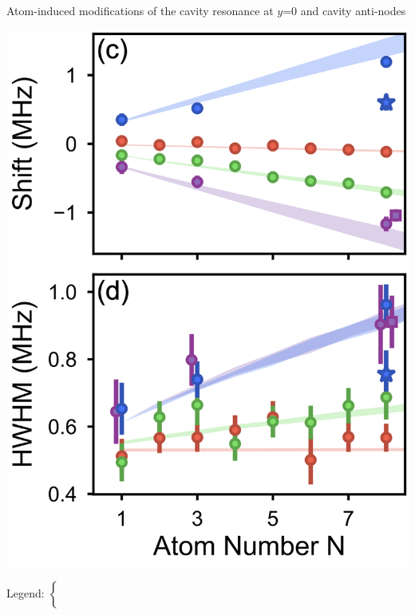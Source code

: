 \documentclass{beamer}
\begin{document}
\begin{frame}{Atom-induced modifications of the cavity resonance {\tiny at $y$=0 and cavity anti-nodes}}
	\begin{minipage}{0.4\textwidth}
		\includegraphics[width=\textwidth]{Figure_4c.png}
	\end{minipage}
	\hspace{0.3em}
	\begin{minipage}{0.57\textwidth}
		\begin{minipage}{0.35\textwidth}
			\footnotesize
			\vfill
			\begin{minipage}\textwidth
				Legend: $\begin{cases}
				~\\
				~\\
				~\\
				~\\
				~
				\end{cases}$
			\end{minipage}

\end{minipage}
\end{minipage}
\end{frame}
\end{document}
